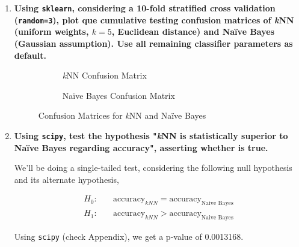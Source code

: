 \documentclass[12pt]{article}
\begin{document}
\begin{enumerate}[leftmargin=\labelsep,resume]
    \item {\bfseries
          Using \texttt{sklearn}, considering a 10-fold stratified cross validation
          (\texttt{random=3}), plot que cumulative testing confusion matrices of
          \textit{k}NN (uniform weights, $k = 5$, Euclidean distance) and Naïve Bayes
          (Gaussian assumption). Use all remaining classifier parameters as default.
          }

          \begin{figure}[H]
              \centering
              \begin{subfigure}{0.49\textwidth}
                  \centering
                  
                  \caption{\textit{k}NN Confusion Matrix}
                  \label{fig:confusion-knn}
              \end{subfigure}
              \begin{subfigure}{0.49\textwidth}
                  \centering
                  
                  \caption{Naïve Bayes Confusion Matrix}
                  \label{fig:confusion-naive-bayes}
              \end{subfigure}
              \caption{Confusion Matrices for \textit{k}NN and Naïve Bayes}
              \label{fig:confusion-matrices}
          \end{figure}

    \item {\bfseries
          Using \texttt{scipy}, test the hypothesis "\textit{k}NN is statistically
          superior to Naïve Bayes regarding accuracy", asserting whether is true.
          }

          We'll be doing a single-tailed test, considering the following null
          hypothesis and its alternate hypothesis,

          $$
              \begin{aligned}
                  H_0: & \quad\text{accuracy}_{kNN} = \text{accuracy}_{\text{Naive Bayes}} \\
                  H_1: & \quad\text{accuracy}_{kNN} > \text{accuracy}_{\text{Naive Bayes}}
              \end{aligned}
          $$

          Using \texttt{scipy} (check Appendix), we get a p-value of 0.0013168.


\end{enumerate}
\end{document}

